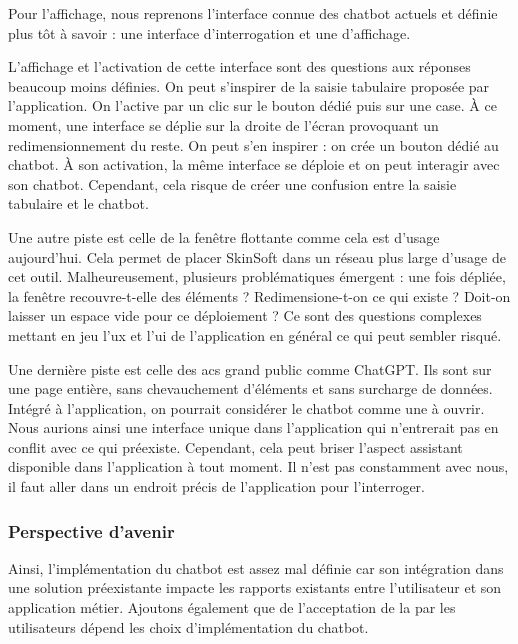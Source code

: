 Pour l'affichage, nous reprenons l'interface connue des \gls{chatbot} actuels et définie plus tôt à savoir : une interface d'interrogation et une d'affichage. 

L'affichage et l'activation de cette interface sont des questions aux réponses beaucoup moins définies. On peut s'inspirer de la saisie tabulaire proposée par l'application. On l'active par un clic sur le bouton dédié puis sur une case. À ce moment, une interface se déplie sur la droite de l'écran provoquant un redimensionnement du reste. On peut s'en inspirer : on crée un bouton dédié au \gls{chatbot}. À son activation, la même interface se déploie et on peut interagir avec son \gls{chatbot}. Cependant, cela risque de créer une confusion entre la saisie tabulaire et le \gls{chatbot}. 

Une autre piste est celle de la fenêtre flottante comme cela est d'usage aujourd'hui. Cela permet de placer SkinSoft dans un réseau plus large d'usage de cet outil. Malheureusement, plusieurs problématiques émergent : une fois dépliée, la fenêtre recouvre-t-elle des éléments ? Redimensione-t-on ce qui existe ? Doit-on laisser un espace vide pour ce déploiement ? Ce sont des questions complexes mettant en jeu l'\gls{ux} et l'\gls{ui} de l'application en général ce qui peut sembler risqué. 

Une dernière piste est celle des \glspl{ac} grand public comme ChatGPT. Ils sont sur une page entière, sans chevauchement d'éléments et sans surcharge de données. Intégré à l'application, on pourrait considérer le \gls{chatbot} comme une  à ouvrir. Nous aurions ainsi une interface unique dans l'application qui n'entrerait pas en conflit avec ce qui préexiste. Cependant, cela peut briser l'aspect assistant disponible dans l'application à tout moment. Il n'est pas constamment avec nous, il faut aller dans un endroit précis de l'application pour l'interroger.

\subsubsection{Perspective d'avenir}

Ainsi, l'implémentation du \gls{chatbot} est assez mal définie car son intégration dans une solution préexistante impacte les rapports existants entre l'utilisateur et son application métier. Ajoutons également que de l'acceptation de la  par les utilisateurs dépend les choix d'implémentation du \gls{chatbot}.\newline


